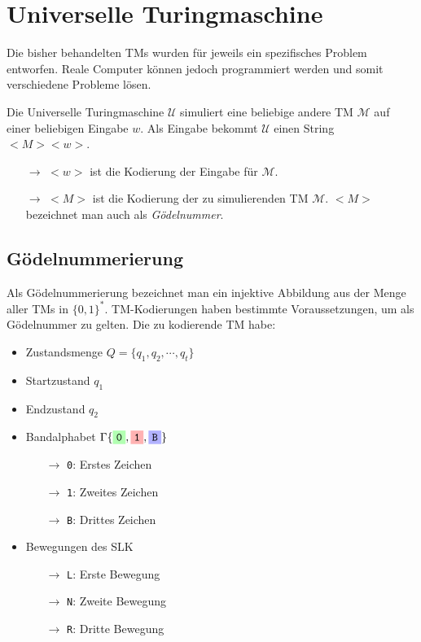 \documentclass{scrartcl}%
\begin{document}

    \section*{Universelle Turingmaschine}
    Die bisher behandelten TMs wurden für jeweils ein spezifisches Problem entworfen.
    Reale Computer können jedoch programmiert werden und somit verschiedene Probleme lösen.

    \vspace*{0.3cm}
    Die Universelle Turingmaschine $\mathcal{U}$ simuliert eine beliebige andere TM
    $\mathcal{M}$ auf einer beliebigen Eingabe $w$.
    Als Eingabe bekommt $\mathcal{U}$ einen String $<M><w>$.

    \begin{itemize}
        \item [$\rightarrow$] $<w>$ ist die Kodierung der Eingabe für $\mathcal{M}$.
        \item [$\rightarrow$] $<M>$ ist die Kodierung der zu simulierenden TM $\mathcal{M}$.
        $<M>$ bezeichnet man auch als \textit{Gödelnummer}.
    \end{itemize}

    \subsection*{Gödelnummerierung}
    Als Gödelnummerierung bezeichnet man ein injektive Abbildung aus der Menge aller TMs in $\{0,1\}^*$.
    TM-Kodierungen haben bestimmte Voraussetzungen, um als Gödelnummer zu gelten.
    Die zu kodierende TM habe:

    \begin{itemize}
        \item Zustandsmenge $Q = {\{q_1,q_2, \cdots, q_t\}}$
        \item Startzustand $q_1$
        \item Endzustand $q_2$
        \item Bandalphabet $\Gamma \{\colorbox{green!30}{\texttt{0}},\colorbox{red!30}{\texttt{1}},\colorbox{blue!30}{\texttt{B}}\}$
        \begin{itemize}
            \item [$\rightarrow$] \colorbox{green!30}{\texttt{0}}: Erstes Zeichen
            \item [$\rightarrow$] \colorbox{red!30}{\texttt{1}}: Zweites Zeichen
            \item [$\rightarrow$] \colorbox{blue!30}{\texttt{B}}: Drittes Zeichen
        \end{itemize}
        \item Bewegungen des SLK
        \begin{itemize}
            \item [$\rightarrow$] \texttt{L}: Erste Bewegung
            \item [$\rightarrow$] \texttt{N}: Zweite Bewegung
            \item [$\rightarrow$] \texttt{R}: Dritte Bewegung
        \end{itemize}
    \end{itemize}
\end{document}
